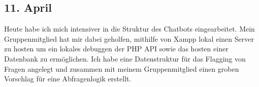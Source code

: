 \subsection{11. April}
Heute habe ich mich intensiver in die Struktur des Chatbots eingearbeitet. Mein Gruppenmitglied hat mir dabei geholfen, mithilfe von Xampp lokal einen Server zu hosten um ein lokales debuggen der PHP API sowie das hosten einer Datenbank zu ermöglichen. Ich habe eine Datenstruktur für das Flagging von Fragen angelegt und zusammen mit meinem Gruppenmitglied einen groben Vorschlag für eine Abfragenlogik erstellt.